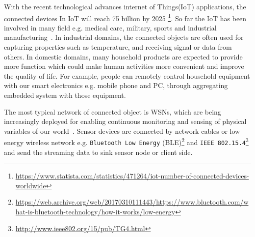 


\begin{comment} %
                
                |- IoT
- Constant -----|- WSNs sensors
                |- streaming data, data analysis
                |- Embedded system
                
- Problem  -----|- power consuming, radio transmission is power-hungry

                
- goal, motive -|- motivation: try to extend the work time of the Battery-powered devices 
                |- goal: Reduce rate of transmission of through data summarization

- contribution -|- Formalize the description of original LTC algorithm
                |- Extend LTC to dimension $n$.
                |- Propose an algebraic formulation of n-dimensional LTC algorithm.
                |- Introduce an norm-independent expression of n-dimensional LTC, according 
                |  to the algebraic formulation.
                |- Internship and publish
- outline
\end{comment}


With the recent technological advances internet of Things(IoT) applications, the
connected devices In IoT will reach 75 billion by 2025
\footnote{\url{https://www.statista.com/statistics/471264/iot-number-of-connected-devices-worldwide}}. 
So far the IoT has been involved in many field e.g. medical care, military,
sports and industrial manufacturing~\cite{boudargham2017exhaustive,
lai2013survey, da2014internet}. In industrial domains, the connected objects are
often used for capturing properties such as temperature, and receiving signal or
data from others. In domestic domains, many household products are expected to
provide more function which could make human activities more convenient and
improve the quality of life. For example, people can remotely control household
equipment with our smart electronics e.g. mobile phone and PC, through
aggregating embedded system with those equipment. 

The most typical network of connected object is WSNs, which are being
increasingly deployed for enabling continuous monitoring and sensing of physical
variables of our world~\cite{li2016temporal}. Sensor devices are connected by
network cables or low energy wireless network e.g. \texttt{Bluetooth Low Energy}
(BLE)\footnote{\url{https://web.archive.org/web/20170310111443/https://www.bluetooth.com/what-is-bluetooth-technology/how-it-works/low-energy}}
and \texttt{IEEE 802.15.4}\footnote{\url{http://www.ieee802.org/15/pub/TG4.html}}
and send the streaming data to sink sensor node or client side.

